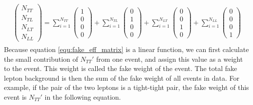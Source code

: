 \begin{align}
\begin{split}
\left( \begin{array}{c}
N_{TT} \\
N_{TL} \\
N_{LT} \\
N_{LL}
\end{array} \right)
=
\sum_{i=1}^{N_{TT}}
\left( \begin{array}{c}
1 \\
0 \\
0 \\
0
\end{array} \right)
+
\sum_{i=1}^{N_{TL}}
\left( \begin{array}{c}
0 \\
1 \\
0 \\
0
\end{array} \right)
+
\sum_{i=1}^{N_{LT}}
\left( \begin{array}{c}
0 \\
0 \\
1 \\
0
\end{array} \right)
+
\sum_{i=1}^{N_{LL}}
\left( \begin{array}{c}
0 \\
0 \\
0 \\
1
\end{array} \right)
\end{split}
\end{align}
Because equation \ref{equ:fake_eff_matrix} is a linear function, we can first calculate the small contribution of $N_{TT}'$ from one event, and assign this value as a weight to the event.
This weight is called the fake weight of the event.
The total fake lepton background is then the sum of the fake weight of all events in data.
For example, if the pair of the two leptons is a tight-tight pair, the fake weight of this event is $N_{TT}'$ in the following equation.
